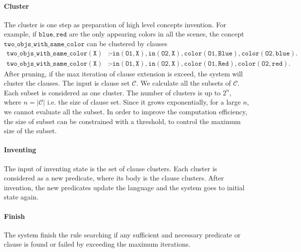 \documentclass[
]{ceurart}
\begin{document}
	\paragraph{Cluster}
	The cluster is one step as preparation of high level concepts invention. 
	For example, if $ \mathtt{blue}, \mathtt{red} $  are the only appearing colors in all the scenes,  the concept $ \mathtt{two\_objs\_with\_same\_color} $ can be clustered by clauses 
	\begin{align*}
		\mathtt{two\_objs\_with\_same\_color(X)}&\mathtt{\texttt{:-}in(O1,X),in(O2,X),color(O1,Blue),color(O2,blue).}\\ \mathtt{two\_objs\_with\_same\_color(X)}&\mathtt{\texttt{:-}in(O1,X),in(O2,X),color(O1,Red),color(O2,red).}
	\end{align*}
	After pruning, if the max iteration of clause extension is exceed, the system will cluster the clauses. The input is clause set $ \mathcal{C} $. 
	We calculate all the subsets of $ \mathcal{C} $. Each subset is considered as one cluster. The number of clusters is up to $ 2^n $, where $ n=|\mathcal{C}| $ i.e. the size of clause set. Since it grows exponentially, for a large $ n $, we cannot evaluate all the subset. In order to improve the computation efficiency, the size of subset can be constrained with a threshold, to control the maximum size of the subset.
	
	\paragraph{Inventing}
	The input of inventing state is the set of clause clusters. Each cluster is considered as a new predicate, where its body is the clause clusters. After invention, the new predicates update the language and the system goes to initial state again.
	
	\paragraph{Finish} 
	The system finish the rule searching if any sufficient and necessary predicate or clause is found or failed by exceeding the maximum iterations.
	
	
	
\end{document}
